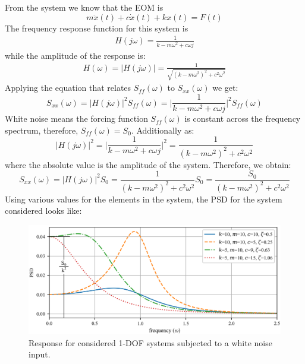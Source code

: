 \documentclass[12pt,letter]{article}
\begin{document}
\begin{example}
	\noindent From the system we know that the EOM is 
	\begin{equation}
	m\ddot{x}(t) +c\dot{x}(t) + kx(t) = F(t)
	\end{equation} 
	The frequency response function for this system is 
	\begin{eqnarray}
		H(j\omega) = \frac{1}{k-m\omega^2+c\omega j}
	\end{eqnarray}
	while the amplitude of the response is:
	\begin{eqnarray}
	H(\omega) = |H(j\omega)| = \frac{1}{\sqrt{(k-m\omega^2)^2+c^2\omega^2}}
	\end{eqnarray}
	Applying the equation that relates $S_{ff}(\omega)$ to $S_{xx}(\omega)$ we get:
	\begin{equation}
	S_{xx}(\omega) =  |H(j\omega)|^2 S_{ff}(\omega) = \bigg|\frac{1}{k-m\omega^2+c\omega j} \bigg|^2 S_{ff}(\omega) 
	\end{equation}
	White noise means the forcing function $S_{ff}(\omega)$ is constant across the frequency spectrum, therefore, $S_{ff}(\omega)=S_0$. Additionally as:
	\begin{equation}
	|H(j\omega)|^2 = \bigg|\frac{1}{k-m\omega^2+c\omega j} \bigg|^2 = \frac{1}{(k-m\omega^2)^2+c^2\omega^2}
	\end{equation}
	where the absolute value is the amplitude of the system. Therefore, we obtain:
	\begin{equation}
	S_{xx}(\omega) =  |H(j\omega)|^2 S_{0}= \frac{1}{(k-m\omega^2)^2+c^2\omega^2}S_0 = \frac{S_0}{(k-m\omega^2)^2+c^2\omega^2}
	\end{equation}
	Using various values for the elements in the system, the PSD for the system considered looks like:
	\begin{figure}[H]
		\centering
		\includegraphics[width=1\textwidth]{../figures/response_to_white_noise_with_annotation.png}
		\caption{Response for considered 1-DOF systems subjected to a white noise input.}
	\end{figure}
\end{example}  
\end{document}

